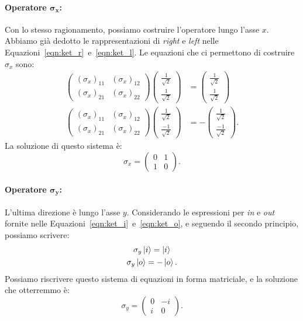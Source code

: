 \paragraph{Operatore $\boldsymbol{\sigma_x}$:} Con lo stesso ragionamento, possiamo costruire l'operatore lungo l'asse $x$. Abbiamo già dedotto le rappresentazioni di \emph{right} e \emph{left} nelle Equazioni~\ref{eqn:ket_r}~e~\ref{eqn:ket_l}. Le equazioni che ci permettono di costruire $\sigma_x$ sono:
\begin{align*}
	\begin{pmatrix}
		(\sigma_x)_{11} &(\sigma_x)_{12}\\
		(\sigma_x)_{21} &  (\sigma_x)_{22}
	\end{pmatrix} 
	\begin{pmatrix}
		\frac{1}{\sqrt{2}}\\
		\frac{1}{\sqrt{2}}
	\end{pmatrix} &= 
	\begin{pmatrix}
		\frac{1}{\sqrt{2}}\\
		\frac{1}{\sqrt{2}}
	\end{pmatrix} \\
	\begin{pmatrix}
		(\sigma_x)_{11} &  (\sigma_x)_{12}\\
		(\sigma_x)_{21} &  (\sigma_x)_{22}
	\end{pmatrix} 
	\begin{pmatrix}
		\frac{1}{\sqrt{2}}\\
		\frac{-1}{\sqrt{2}}
	\end{pmatrix} &= -
	\begin{pmatrix}
		\frac{1}{\sqrt{2}}\\
		\frac{-1}{\sqrt{2}}
	\end{pmatrix}.
\end{align*}
La soluzione di questo sistema è:
\[
\sigma_x = 
\begin{pmatrix}
	0 & 1\\
	1 & 0
\end{pmatrix}.
\label{eqn:obs_x}
\]

\paragraph{Operatore $\boldsymbol{\sigma_y}$:} L'ultima direzione è lungo l'asse $y$. Considerando le espressioni per \emph{in} e \emph{out} fornite nelle Equazioni~\ref{eqn:ket_i}~e~\ref{eqn:ket_o}, e seguendo il secondo principio, possiamo scrivere:
\begin{gather*}
	\sigma_y \Ket{i} = \Ket{i}\\
	\sigma_y \Ket{o} = -\Ket{o}.
\end{gather*}
Possiamo riscrivere questo sistema di equazioni in forma matriciale, e la soluzione che otterremmo è:
\[
\sigma_y = 
\begin{pmatrix}
	0 & -i\\
	i & 0
\end{pmatrix}.
\label{eqn:obs_y}
\]

